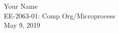 \documentclass[letterpaper,twoside,notitlepage,12pt]{article}
\begin{document}

\newpage

\noindent
Your Name \\
EE-2063-01: Comp Org/Microprocess \\
May 9, 2019








\end{document}
